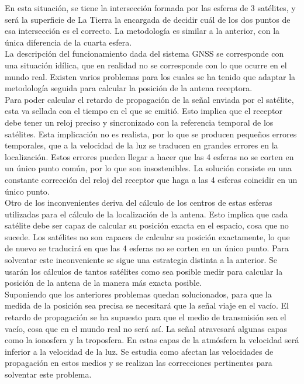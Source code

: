 En esta situación, se tiene la intersección formada por las esferas de 3 satélites, y será la superficie de La Tierra la encargada de decidir cuál de los dos puntos de esa intersección es el correcto. La metodología es similar a la anterior, con la única diferencia de la cuarta esfera. \\
La descripción del funcionamiento dada del sistema GNSS se corresponde con una situación idílica, que en realidad no se corresponde con lo que ocurre en el mundo real. Existen varios problemas para los cuales se ha tenido que adaptar la metodología seguida para calcular la posición de la antena receptora. \\
Para poder calcular el retardo de propagación de la señal enviada por el satélite, esta va sellada con el tiempo en el que se emitió. Esto implica que el receptor debe tener un reloj preciso y sincronizado con la referencia temporal de los satélites. Esta implicación no es realista, por lo que se producen pequeños errores temporales, que a la velocidad de la luz se traducen en grandes errores en la localización. Estos errores pueden llegar a hacer que las 4 esferas no se corten en un único punto común, por lo que son insostenibles. La solución consiste en una constante corrección del reloj del receptor que haga a las 4 esferas coincidir en un único punto. \\
Otro de los inconvenientes deriva del cálculo de los centros de estas esferas utilizadas para el cálculo de la localización de la antena. Esto implica que cada satélite debe ser capaz de calcular su posición exacta en el espacio, cosa que no sucede. Los satélites no son capaces de calcular su posición exactamente, lo que de nuevo se traducirá en que las 4 esferas no se corten en un único punto. Para solventar este inconveniente se sigue una estrategia distinta a la anterior. Se usarán los cálculos de tantos satélites como sea posible medir para calcular la posición de la antena de la manera más exacta posible. \\
Suponiendo que los anteriores problemas quedan solucionados, para que la medida de la posición sea precisa se necesitará que la señal viaje en el vacío. El retardo de propagación se ha supuesto para que el medio de transmisión sea el vacío, cosa que en el mundo real no será así. La señal atravesará algunas capas como la ionosfera y la troposfera. En estas capas de la atmósfera la velocidad será inferior a la velocidad de la luz. Se estudia como afectan las velocidades de propagación en estos medios y se realizan las correcciones pertinentes para solventar este problema.

